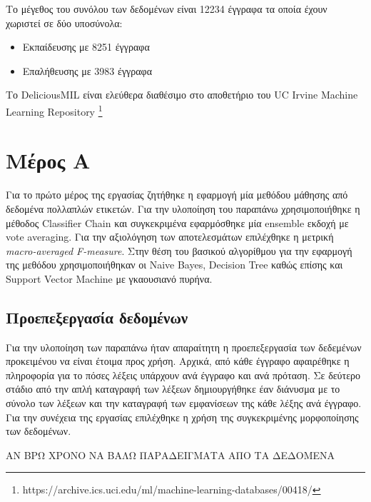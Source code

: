 Το μέγεθος του συνόλου των δεδομένων είναι 12234 έγγραφα τα οποία έχουν χωριστεί σε δύο υποσύνολα: 
	\begin{itemize}
		\item Εκπαίδευσης με 8251 έγγραφα
		\item Επαλήθευσης με 3983 έγγραφα
	\end{itemize}

Το DeliciousMIL είναι ελεύθερα διαθέσιμο στο αποθετήριο του UC Irvine Machine Learning Repository \footnote{https://archive.ics.uci.edu/ml/machine-learning-databases/00418/}


\section{Μέρος Α}
Για το πρώτο μέρος της εργασίας ζητήθηκε η εφαρμογή μία μεθόδου μάθησης από δεδομένα πολλαπλών ετικετών. Για την υλοποίηση του παραπάνω χρησιμοποιήθηκε η μέθοδος Classifier Chain και συγκεκριμένα εφαρμόσθηκε μία ensemble εκδοχή με vote averaging. Για την αξιολόγηση των αποτελεσμάτων επιλέχθηκε η μετρική \emph{macro-averaged F-measure}. Στην θέση του βασικού αλγορίθμου για την εφαρμογή της μεθόδου χρησιμοποιήθηκαν οι Naive Bayes, Decision Tree καθώς επίσης και Support Vector Machine με γκαουσιανό πυρήνα. 

\subsection{Προεπεξεργασία δεδομένων}
Για την υλοποίηση των παραπάνω ήταν απαραίτητη η προεπεξεργασία των δεδεμένων προκειμένου να είναι έτοιμα προς χρήση. Αρχικά, από κάθε έγγραφο αφαιρέθηκε η πληροφορία για το πόσες λέξεις υπάρχουν ανά έγγραφο και ανά πρόταση. Σε δεύτερο στάδιο από την απλή καταγραφή των λέξεων δημιουργήθηκε έαν διάνυσμα με το σύνολο των λέξεων και την καταγραφή των εμφανίσεων της κάθε λέξης ανά έγγραφο. Για την συνέχεια της εργασίας επιλέχθηκε η χρήση της συγκεκριμένης μορφοποίησης των δεδομένων.

{\color{red} ΑΝ ΒΡΩ ΧΡΟΝΟ ΝΑ ΒΑΛΩ ΠΑΡΑΔΕΙΓΜΑΤΑ ΑΠΟ ΤΑ ΔΕΔΟΜΕΝΑ}


